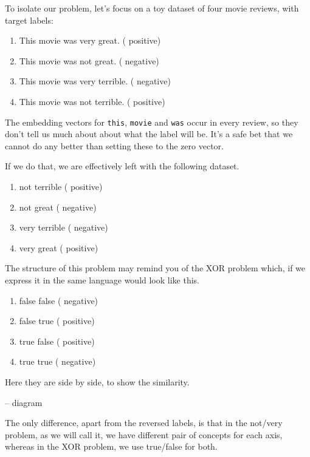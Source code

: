 \documentclass{pca}
\newcommand{\rc}[1]{{\color{my-red} #1}}
\newcommand{\bc}[1]{{\color{my-blue} #1}}
\theoremstyle{theorem}
\theoremstyle{definition}
\theoremstyle{proof}
\begin{document}
To isolate our problem, let's focus on a toy dataset of four movie reviews, with target labels:

\begin{enumerate}
\item This movie was very great. (\bc{positive})
\item This movie was not great. (\rc{negative})
\item This movie was very terrible. (\rc{negative})
\item This movie was not terrible. (\bc{positive})
\end{enumerate}

The embedding vectors for \texttt{this}, \texttt{movie} and \texttt{was} occur in every review, so they don't tell us much about about what the label will be. It's a safe bet that we cannot do any better than setting these to the zero vector.

\pagebreak[4]

If we do that, we are effectively left with the following dataset.

\begin{enumerate}
\item not terrible (\bc{positive})
\item not great (\rc{negative})
\item very terrible (\rc{negative})
\item very great (\bc{positive})
\end{enumerate}

The structure of this problem may remind you of the XOR problem which, if we express it in the same language would look like this.

\begin{enumerate}
\item false false (\rc{negative})
\item false true (\bc{positive})
\item true false (\bc{positive})
\item true true (\rc{negative})
\end{enumerate}


Here they are side by side, to show the similarity.

-- diagram

The only difference, apart from the reversed labels, is that in the not/very problem, as we will call it, we have different pair of concepts for each axis, whereas in the XOR problem, we use true/false for both.
\end{document}
